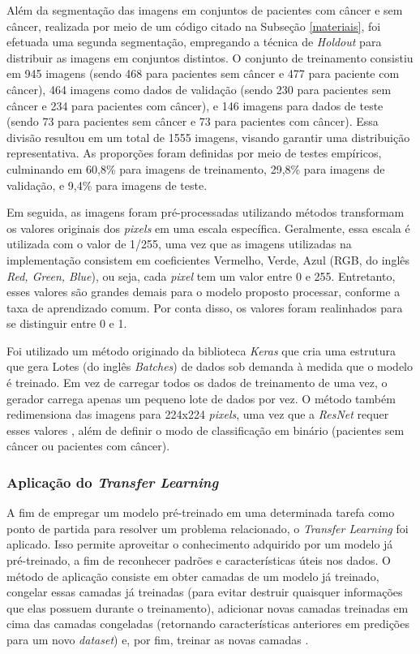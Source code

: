 Além da segmentação das imagens em conjuntos de pacientes com câncer e sem câncer, realizada por meio de um código citado na Subseção \ref{materiais}, foi efetuada uma segunda segmentação, empregando a técnica de \textit{Holdout} para distribuir as imagens em conjuntos distintos. O conjunto de treinamento consistiu em 945 imagens (sendo 468 para pacientes sem câncer e 477 para paciente com câncer), 464 imagens como dados de validação (sendo 230 para pacientes sem câncer e 234 para pacientes com câncer), e 146 imagens para dados de teste (sendo 73 para pacientes sem câncer e 73 para pacientes com câncer). Essa divisão resultou em um total de 1555 imagens, visando garantir uma distribuição representativa. As proporções foram definidas por meio de testes empíricos, culminando em 60,8\% para imagens de treinamento, 29,8\% para imagens de validação, e 9,4\% para imagens de teste.

Em seguida, as imagens foram pré-processadas utilizando métodos transformam os valores originais dos \textit{pixels} em uma escala específica. Geralmente, essa escala é utilizada com o valor de 1/255, uma vez que as imagens utilizadas na implementação consistem em coeficientes Vermelho, Verde, Azul (RGB, do inglês \textit{Red, Green, Blue}), ou seja, cada \textit{pixel} tem um valor entre 0 e 255. Entretanto, esses valores são grandes demais para o modelo proposto processar, conforme a taxa de aprendizado comum. Por conta disso, os valores foram realinhados para se distinguir entre 0 e 1.

Foi utilizado um método originado da biblioteca \textit{Keras} que cria uma estrutura que gera Lotes (do inglês \textit{Batches}) de dados sob demanda à medida que o modelo é treinado. Em vez de carregar todos os dados de treinamento de uma vez, o gerador carrega apenas um pequeno lote de dados por vez. O método também redimensiona das imagens para 224x224 \textit{pixels}, uma vez que a \textit{ResNet} requer esses valores \cite{kerasresnet50}, além de definir o modo de classificação em binário (pacientes sem câncer ou pacientes com câncer).



\subsubsection{\esp Aplicação do \textit{Transfer Learning}} \label{transfer}

A fim de empregar um modelo pré-treinado em uma determinada tarefa como ponto de partida para resolver um problema relacionado, o \textit{Transfer Learning} foi aplicado. Isso permite aproveitar o conhecimento adquirido por um modelo já pré-treinado, a fim de reconhecer padrões e características úteis nos dados. O método de aplicação consiste em obter camadas de um modelo já treinado, congelar essas camadas já treinadas (para evitar destruir quaisquer informações que elas possuem durante o treinamento), adicionar novas camadas treinadas em cima das camadas congeladas (retornando características anteriores em predições para um novo \textit{dataset}) e, por fim, treinar as novas camadas \cite{kerastransfer}.

